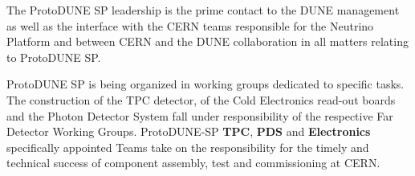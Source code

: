 The ProtoDUNE SP leadership is the prime contact to the DUNE management as well as the interface with the CERN teams responsible for the Neutrino Platform and between CERN and the DUNE collaboration in all matters relating to ProtoDUNE SP.

ProtoDUNE SP is being organized in working groups dedicated to specific tasks. The construction of the TPC detector, of the Cold Electronics read-out boards and the Photon Detector System fall under responsibility of the respective Far Detector Working Groups. ProtoDUNE-SP {\bf TPC}, {\bf PDS} and {\bf Electronics} specifically appointed Teams take on the responsibility for the timely and technical success of component assembly, test and commissioning at CERN.





